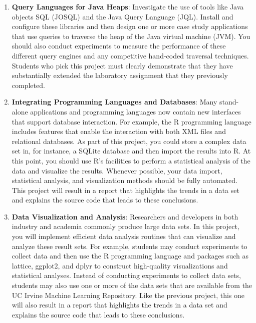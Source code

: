 \begin{enumerate}
  \item {\bf Query Languages for Java Heaps}: Investigate the use of tools like Java objects SQL (JOSQL) and the Java
    Query Language (JQL).  Install and configure these libraries and then design one or more case study applications
    that use queries to traverse the heap of the Java virtual machine (JVM).  You should also conduct experiments to
    measure the performance of these different query engines and any competitive hand-coded traversal techniques.
    Students who pick this project must clearly demonstrate that they have substantially extended the laboratory
    assignment that they previously completed. 
    
  \item {\bf Integrating Programming Languages and Databases}: Many stand-alone applications and programming languages
    now contain new interfaces that support database interaction.  For example, the R programming language includes
    features that enable the interaction with both XML files and relational databases.  As part of this project, you
    could store a complex data set in, for instance, a SQLite database and then import the results into R.  At this
    point, you should use R's facilities to perform a statistical analysis of the data and visualize the results.
    Whenever possible, your data import, statistical analysis, and visualization methods should be fully automated. This
    project will result in a report that highlights the trends in a data set and explains the source code that leads to
    these conclusions.

  \item {\bf Data Visualization and Analysis}: Researchers and developers in both industry and academia commonly produce
    large data sets.  In this project, you will implement efficient data analysis routines that can visualize and
    analyze these result sets.  For example, students may conduct experiments to collect data and then use the R
    programming language and packages such as lattice, ggplot2, and dplyr to construct high-quality visualizations and
    statistical analyses.  Instead of conducting experiments to collect data sets, students may also use one or more of
    the data sets that are available from the UC Irvine Machine Learning Repository.  Like the previous project, this
    one will also result in a report that highlights the trends in a data set and explains the source code that leads to
    these conclusions.


\end{enumerate}

